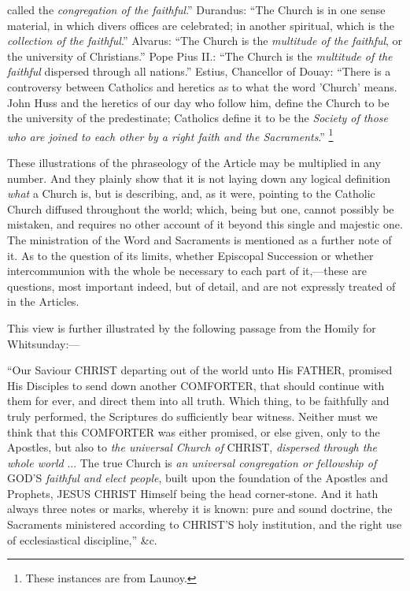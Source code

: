 called the \emph{congregation of the faithful}.'' Durandus:
``The Church is in one sense material, in which divers offices are
celebrated; in another spiritual, which is the \emph{collection of the
faithful}.'' Alvarus: ``The Church is the \emph{multitude of
the faithful}, or the university of Christians.'' Pope Pius
II.: ``The Church is the \emph{multitude of the faithful}
dispersed through all nations.'' Estius, Chancellor of Douay:
``There is a controversy between Catholics and heretics as to what
the word 'Church' means. John Huss and the heretics of our day who
follow him, define the Church to be the university of the
predestinate; Catholics define it to be the \emph{Society of those who are
joined to each other by a right faith and the Sacraments}.'' \footnote{These instances are from Launoy.}

These illustrations of the phraseology of the Article may be
multiplied in any number. And they plainly show that it is not laying
down any logical definition \emph{what} a Church is, but is
describing, and, as it were, pointing to the Catholic Church diffused
throughout the world; which, being but one, cannot possibly be
mistaken, and requires no other account of it beyond this single and
majestic one. The ministration of the Word and Sacraments is mentioned
as a further note of it. As to the question of its limits, whether
Episcopal Succession or whether intercommunion with the whole be
necessary to each part of it,—these are questions, most
important indeed, but of detail, and are not expressly treated of in
the Articles.

This view is further illustrated by the following passage from the
Homily for Whitsunday:—

``Our Saviour CHRIST
departing out of the world unto His FATHER,
promised His Disciples to send down another COMFORTER,
that should continue with them for ever, and direct them into all
truth. Which thing, to be faithfully and truly performed, the
Scriptures do sufficiently bear witness. Neither must we think that
this COMFORTER was either
promised, or else given, only to the Apostles, but also to \emph{the
universal Church of} CHRIST,
\emph{dispersed through the whole world} ... The true Church is \emph{an
universal congregation or fellowship of} GOD'S
\emph{faithful and elect people}, built upon the foundation of the
Apostles and Prophets, JESUS
CHRIST Himself being the
head corner-stone. And it hath always three notes or marks, whereby it
is known: pure and sound doctrine, the Sacraments ministered according
to CHRIST'S holy
institution, and the right use of ecclesiastical discipline,''
\&c.

